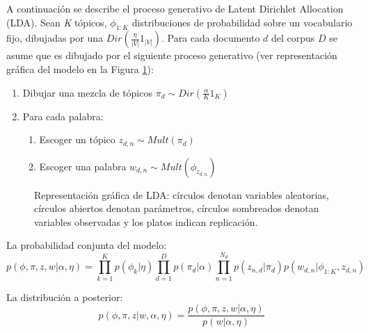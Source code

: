 \documentclass[letterpaper,12pt,oneside]{book} %
\begin{document}
A continuación se describe el proceso generativo de Latent Dirichlet Allocation (LDA). Sean \textit{K} tópicos, $\phi_{1:K}$ distribuciones de probabilidad sobre un vocabulario fijo, dibujadas por una $Dir(\frac{\eta}{|V|}1_{|V|})$. Para cada documento $d$ del corpus $D$ se asume que es dibujado por el siguiente proceso generativo (ver representación gráfica del modelo en la Figura \ref{img:lda}):
\begin{enumerate}
    \item Dibujar una mezcla de tópicos $\pi_{d}\sim Dir(\frac{\alpha}{K}1_{K})$
    \item Para cada palabra:
    \begin{enumerate}
        \item Escoger un tópico $z_{d,n}\sim Mult(\pi_{d})$
        \item Escoger una palabra $w_{d,n}\sim Mult(\phi_{z_{d,n}})$
    \end{enumerate}
\end{enumerate}

\begin{figure}
  \centering
\caption{Representación gráfica de LDA: círculos denotan variables aleatorias, círculos abiertos denotan parámetros, círculos sombreados denotan variables observadas y los platos indican replicación.}
\label{img:lda}
\end{figure}

La probabilidad conjunta del modelo:
\begin{equation}
    p(\phi, \pi, z, w|\alpha, \eta)= \prod_{k=1}^{K}p(\phi_{k}|\eta)\prod_{d=1}^{D}p(\pi_{d}|\alpha)\prod_{n=1}^{N_{d}}p(z_{n,d}|\pi_{d})p(w_{d,n}|\phi_{1:K}, z_{d,n})
\end{equation}

La distribución a posterior:
\begin{equation}
    p(\phi, \pi, z|w, \alpha, \eta) = \frac{p(\phi, \pi, z, w|\alpha, \eta)}{p(w|\alpha, \eta)}
\end{equation}
\end{document}

